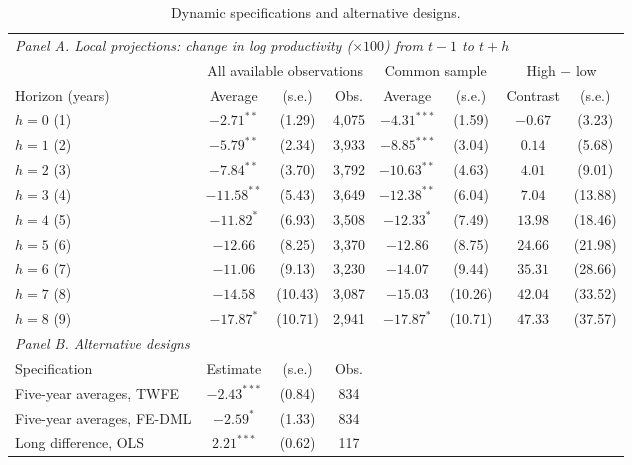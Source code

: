 \documentclass[preprint,12pt,authoryear]{elsarticle}
\begin{document}
\begin{table}[!t]
\centering
\begin{threeparttable}
\caption{Dynamic specifications and alternative designs.}\label{tab:dyn}
\scriptsize
\setlength{\tabcolsep}{3pt}
\begin{tabular}{lccccccc}
\toprule
\multicolumn{8}{l}{\textit{Panel A. Local projections: change in log productivity ($\times100$) from $t-1$ to $t+h$}}\\
 & \multicolumn{3}{c}{All available observations} & \multicolumn{2}{c}{Common sample} & \multicolumn{2}{c}{High $-$ low}\\
\cmidrule(lr){2-4}\cmidrule(lr){5-6}\cmidrule(lr){7-8}
Horizon (years) & Average & (s.e.) & Obs. & Average & (s.e.) & Contrast & (s.e.)\\
\midrule
$h=0$ (1) & $-2.71^{**}$ & (1.29) & 4,075 & $-4.31^{***}$ & (1.59) & $-0.67$ & (3.23)\\
$h=1$ (2) & $-5.79^{**}$ & (2.34) & 3,933 & $-8.85^{***}$ & (3.04) & $0.14$ & (5.68)\\
$h=2$ (3) & $-7.84^{**}$ & (3.70) & 3,792 & $-10.63^{**}$ & (4.63) & $4.01$ & (9.01)\\
$h=3$ (4) & $-11.58^{**}$ & (5.43) & 3,649 & $-12.38^{**}$ & (6.04) & $7.04$ & (13.88)\\
$h=4$ (5) & $-11.82^{*}$ & (6.93) & 3,508 & $-12.33^{*}$ & (7.49) & $13.98$ & (18.46)\\
$h=5$ (6) & $-12.66$ & (8.25) & 3,370 & $-12.86$ & (8.75) & $24.66$ & (21.98)\\
$h=6$ (7) & $-11.06$ & (9.13) & 3,230 & $-14.07$ & (9.44) & $35.31$ & (28.66)\\
$h=7$ (8) & $-14.58$ & (10.43) & 3,087 & $-15.03$ & (10.26) & $42.04$ & (33.52)\\
$h=8$ (9) & $-17.87^{*}$ & (10.71) & 2,941 & $-17.87^{*}$ & (10.71) & $47.33$ & (37.57)\\
\midrule
\multicolumn{8}{l}{\textit{Panel B. Alternative designs}}\\
Specification & Estimate & (s.e.) & Obs. & & & & \\
\midrule
Five-year averages, TWFE & $-2.43^{***}$ & (0.84) & 834 \\
Five-year averages, FE-DML & $-2.59^{*}$ & (1.33) & 834 \\
Long difference, OLS & $2.21^{***}$ & (0.62) & 117 \\

\end{tabular}
\end{threeparttable}
\end{table}
\end{document}
